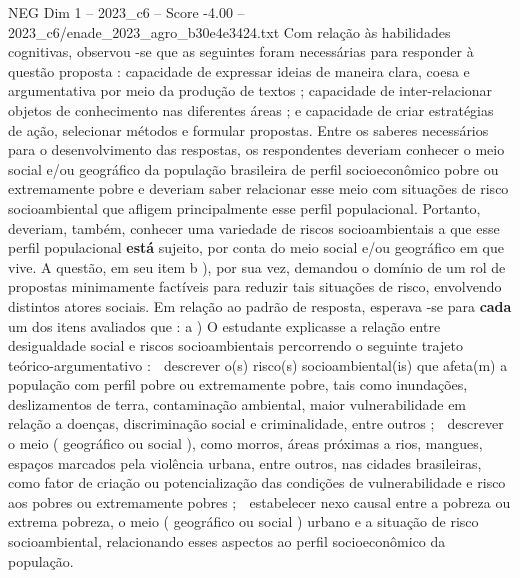 \begin{textsample}{NEG Dim 1 – 2023\_c6 – Score -4.00 – 2023\_c6/enade\_2023\_agro\_b30e4e3424.txt}
Com relação às habilidades cognitivas, observou -se que as seguintes foram necessárias para responder à questão proposta : capacidade de expressar ideias de maneira clara, coesa e argumentativa por meio da produção de textos ; capacidade de inter-relacionar objetos de conhecimento nas diferentes áreas ; e capacidade de criar estratégias de ação, selecionar métodos e formular propostas.
Entre os saberes necessários para o desenvolvimento das respostas, os respondentes deveriam conhecer o meio social e/ou geográfico da população brasileira de perfil socioeconômico pobre ou extremamente pobre e deveriam saber relacionar esse meio com situações de risco socioambiental que afligem principalmente esse perfil populacional.
Portanto, deveriam, também, conhecer uma variedade de riscos socioambientais a que esse perfil populacional \textbf{está} sujeito, por conta do meio social e/ou geográfico em que vive.
A questão, em seu item b ), por sua vez, demandou o domínio de um rol de propostas minimamente factíveis para reduzir tais situações de risco, envolvendo distintos atores sociais.
Em relação ao padrão de resposta, esperava -se para \textbf{cada} um dos itens avaliados que : a ) O estudante explicasse a relação entre desigualdade social e riscos socioambientais percorrendo o seguinte trajeto teórico-argumentativo :  descrever o(s) risco(s) socioambiental(is) que afeta(m) a população com perfil pobre ou extremamente pobre, tais como inundações, deslizamentos de terra, contaminação ambiental, maior vulnerabilidade em relação a doenças, discriminação social e criminalidade, entre outros ;  descrever o meio ( geográfico ou social ), como morros, áreas próximas a rios, mangues, espaços marcados pela violência urbana, entre outros, nas cidades brasileiras, como fator de criação ou potencialização das condições de vulnerabilidade e risco aos pobres ou extremamente pobres ;  estabelecer nexo causal entre a pobreza ou extrema pobreza, o meio ( geográfico ou social ) urbano e a situação de risco socioambiental, relacionando esses aspectos ao perfil socioeconômico da população.

\end{textsample}
